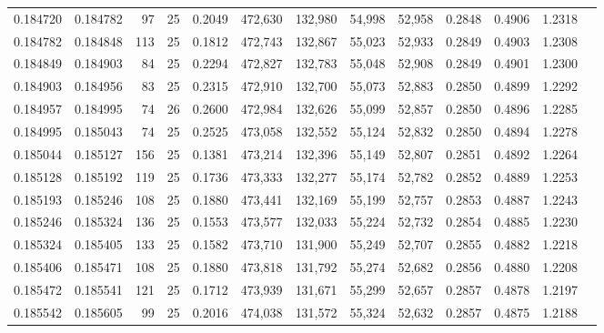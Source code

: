 \begin{tabular}{rrrrrrrrrrrrr}
0.184720 & 0.184782 &    97 &  25 &                                     0.2049 & 472,630 & 132,980 &  54,998 &  52,958 & 0.2848 & 0.4906 & 1.2318 \\
0.184782 & 0.184848 &   113 &  25 &                                     0.1812 & 472,743 & 132,867 &  55,023 &  52,933 & 0.2849 & 0.4903 & 1.2308 \\
0.184849 & 0.184903 &    84 &  25 &                                     0.2294 & 472,827 & 132,783 &  55,048 &  52,908 & 0.2849 & 0.4901 & 1.2300 \\
0.184903 & 0.184956 &    83 &  25 &                                     0.2315 & 472,910 & 132,700 &  55,073 &  52,883 & 0.2850 & 0.4899 & 1.2292 \\
0.184957 & 0.184995 &    74 &  26 &                                     0.2600 & 472,984 & 132,626 &  55,099 &  52,857 & 0.2850 & 0.4896 & 1.2285 \\
0.184995 & 0.185043 &    74 &  25 &                                     0.2525 & 473,058 & 132,552 &  55,124 &  52,832 & 0.2850 & 0.4894 & 1.2278 \\
0.185044 & 0.185127 &   156 &  25 &                                     0.1381 & 473,214 & 132,396 &  55,149 &  52,807 & 0.2851 & 0.4892 & 1.2264 \\
0.185128 & 0.185192 &   119 &  25 &                                     0.1736 & 473,333 & 132,277 &  55,174 &  52,782 & 0.2852 & 0.4889 & 1.2253 \\
0.185193 & 0.185246 &   108 &  25 &                                     0.1880 & 473,441 & 132,169 &  55,199 &  52,757 & 0.2853 & 0.4887 & 1.2243 \\
0.185246 & 0.185324 &   136 &  25 &                                     0.1553 & 473,577 & 132,033 &  55,224 &  52,732 & 0.2854 & 0.4885 & 1.2230 \\
0.185324 & 0.185405 &   133 &  25 &                                     0.1582 & 473,710 & 131,900 &  55,249 &  52,707 & 0.2855 & 0.4882 & 1.2218 \\
0.185406 & 0.185471 &   108 &  25 &                                     0.1880 & 473,818 & 131,792 &  55,274 &  52,682 & 0.2856 & 0.4880 & 1.2208 \\
0.185472 & 0.185541 &   121 &  25 &                                     0.1712 & 473,939 & 131,671 &  55,299 &  52,657 & 0.2857 & 0.4878 & 1.2197 \\
0.185542 & 0.185605 &    99 &  25 &                                     0.2016 & 474,038 & 131,572 &  55,324 &  52,632 & 0.2857 & 0.4875 & 1.2188 \\

\end{tabular}
